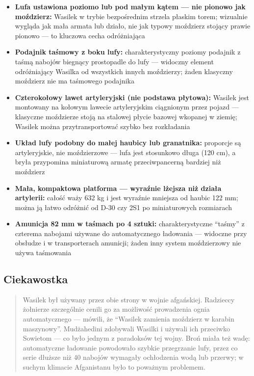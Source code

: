 \documentclass[12pt,oneside]{book}
\providecommand{\tightlist}{%
  \setlength{\itemsep}{0pt}\setlength{\parskip}{0pt}}
\begin{document}
\begin{itemize}
\tightlist
\item
  \textbf{Lufa ustawiona poziomo lub pod małym kątem --- nie pionowo jak
  moździerz:} Wasilek w trybie bezpośrednim strzela płaskim torem;
  wizualnie wygląda jak mała armata lub działo, nie jak typowy moździerz
  stojący prawie pionowo --- to kluczowa cecha odróżniająca
\item
  \textbf{Podajnik taśmowy z boku lufy:} charakterystyczny poziomy
  podajnik z taśmą nabojów biegnący prostopadle do lufy --- widoczny
  element odróżniający Wasilka od wszystkich innych moździerzy; żaden
  klasyczny moździerz nie ma taśmowego podajnika
\item
  \textbf{Czterokołowy lawet artyleryjski (nie podstawa płytowa):}
  Wasilek jest montowany na kołowym lawecie artyleryjskim ciągnionym
  przez pojazd --- klasyczne moździerze stoją na stalowej płycie bazowej
  wkopanej w ziemię; Wasilek można przytransportować szybko bez
  rozkładania
\item
  \textbf{Układ lufy podobny do małej haubicy lub granatnika:} proporcje
  są artyleryjskie, nie moździerzowe --- lufa jest stosunkowo długa (120
  cm), a bryła przypomina miniaturową armatę przeciwpancerną bardziej
  niż moździerz
\item
  \textbf{Mała, kompaktowa platforma --- wyraźnie lżejsza niż działa
  artylerii:} całość waży 632 kg i jest wyraźnie mniejsza od haubic 122
  mm; można ją łatwo odróżnić od D-30 czy 2S1 po miniaturowych
  rozmiarach
\item
  \textbf{Amunicja 82 mm w taśmach po 4 sztuki:} charakterystyczne
  ``taśmy'' z czterema nabojami używane do automatycznego ładowania ---
  widoczne przy obsłudze i w transporterach amunicji; żaden inny system
  moździerzowy nie używa taśmowania
\end{itemize}

\subsection{Ciekawostka}\label{ciekawostka-34}

\begin{quote}
Wasilek był używany przez obie strony w wojnie afgańskiej. Radzieccy
żołnierze szczególnie cenili go za możliwość prowadzenia ognia
automatycznego --- mówili, że ``Wasilek zamienia moździerz w karabin
maszynowy''. Mudżahedini zdobywali Wasilki i używali ich przeciwko
Sowietom --- co było jednym z paradoksów tej wojny. Broń miała też wadę:
automatyczne ładowanie powodowało szybkie przegrzanie lufy, przez co
serie dłuższe niż 40 nabojów wymagały ochłodzenia wodą lub przerwy; w
suchym klimacie Afganistanu było to poważnym problemem.
\end{quote}
\end{document}
